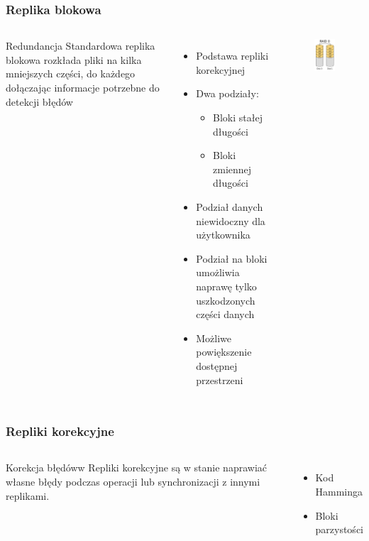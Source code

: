\documentclass{beamer}
\begin{document}
\begin{frame}
        \frametitle{Replika blokowa}
		\begin{columns}
		\begin{block}{Redundancja}
			Standardowa replika blokowa rozkłada pliki na kilka mniejszych części, do każdego dołączając informacje potrzebne do detekcji błędów
		\end{block}
		\begin{itemize}
			\item Podstawa repliki korekcyjnej 
			\item Dwa podziały:
			\begin{itemize}
				\item Bloki stałej długości
				\item Bloki zmiennej długości
			\end{itemize}
			\item Podział danych niewidoczny dla użytkownika
			\item Podział na bloki umożliwia naprawę tylko uszkodzonych części danych
			\item Możliwe powiększenie dostępnej przestrzeni 
		\end{itemize}
		\begin{figure}
			\includegraphics[scale=0.5]{raid-0.png}
		\end{figure}
		\end{columns}
\end{frame}

\begin{frame}
        \frametitle{Repliki korekcyjne }
	\begin{columns}
		\column{1.0\textwidth}
		\begin{block}{Korekcja błędóww}
		   Repliki korekcyjne są w stanie naprawiać własne błędy podczas operacji lub synchronizacji z innymi replikami.
        \end{block}
		\begin{itemize}
			\item Kod Hamminga 
			\item Bloki parzystości
		\end{itemize}

	\end{columns}
\end{frame}
			
\end{document}
